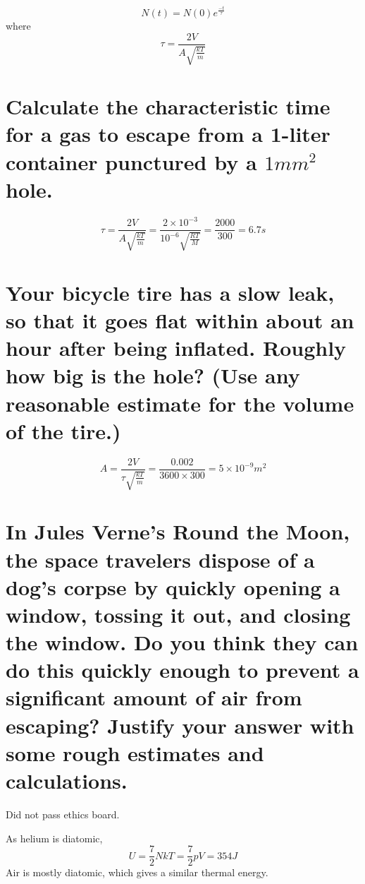 \documentclass[answers]{exam}
\begin{document}
\begin{questions}
\begin{parts}
	\begin{solution}
		$$N(t) = N(0)e^{\frac{-t}{\tau}}$$
		where
		$$\tau = \frac{2V}{A\sqrt{\frac{kT}{m}}}$$
	\end{solution}

	\part{Calculate the characteristic time for a gas to escape from a 1-liter container punctured by a $1\unit{mm^2}$ hole.}

	\begin{solution}
		$$\tau = \frac{2V}{A\sqrt{\frac{kT}{m}}} = \frac{2\times10^{-3}}{10^{-6}\sqrt{\frac{RT}{M}}} = \frac{2000}{300} = 6.7\unit{s}$$
	\end{solution}

	\part{Your bicycle tire has a slow leak, so that it goes flat within about an hour after being inflated. Roughly how big is the hole? (Use any reasonable estimate for the volume of the tire.)}

	\begin{solution}
		$$A = \frac{2V}{\tau\sqrt{\frac{kT}{m}}} = \frac{0.002}{3600\times300} = 5 \times 10^{-9} \unit{m^2}$$
	\end{solution}

	\part{In Jules Verne's Round the Moon, the space travelers dispose of a dog's corpse by quickly opening a window, tossing it out, and closing the window. Do you think they can do this quickly enough to prevent a significant amount of air from escaping? Justify your answer with some rough estimates and calculations.}

	\begin{solution}
		Did not pass ethics board.
	\end{solution}

\end{parts}


\begin{solution}
	As helium is diatomic,
	$$U = \frac{7}{2}NkT = \frac{7}{2}pV = 354\unit{J}$$
	Air is mostly diatomic, which gives a similar thermal energy.
\end{solution}


\end{questions}
\end{document}
